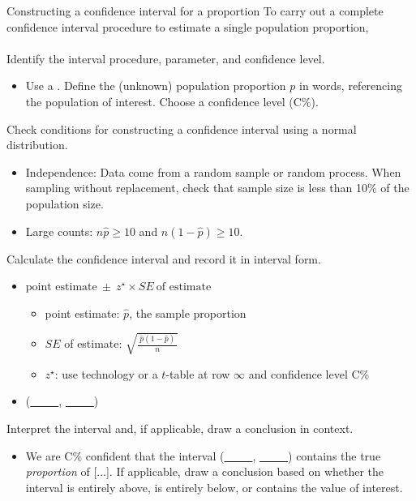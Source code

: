 \begin{onebox}{Constructing a confidence interval for a proportion}
To carry out a complete confidence interval procedure to estimate a single population proportion,
\\
\\
 Identify the interval procedure, parameter, and confidence level.\vspace{-1mm}
\begin{itemize}
\item[] Use a .  Define the (unknown) population proportion $p$ in words, referencing the population of interest.  Choose a confidence level (C\%).  
\end{itemize}
 Check conditions for constructing a confidence interval using a normal distribution.  \vspace{-1mm}
{\setlength{\leftmargini}{13mm}
\begin{itemize}
\setlength{\itemsep}{0mm}
\item[1.] Independence:  Data come from a random sample or random process.  When sampling 
without replacement, check that sample size is less than 10\% of the population size.
\item[2.] Large counts:  $n\hat{p}\ge 10$ and $n(1-\hat{p})\ge 10$.
\end{itemize}
}
 Calculate the confidence interval and record it in interval form.
\begin{itemize}
\item[] $\text{point estimate}\ \pm\ z^{\star} \times SE\ \text{of estimate}$
\begin{itemize}
\item[] point estimate: $\hat{p}$, the sample proportion
\item[] $SE$ of estimate:  $\sqrt{\frac{\ \hat{p}(1-\hat{p})\ }{n}}$
\item[] $z^{\star}$: use technology or a $t$-table at row $\infty$ and confidence level C\%
\end{itemize}
\item[] (\underline{\ \ \ \ \ }, \underline{\ \ \ \ \ })
\end{itemize}
 Interpret the interval and, if applicable, draw a conclusion in context.\vspace{-1mm}
\begin{itemize}
\item[] We are C\% confident that the interval (\underline{\ \ \ \ \ }, \underline{\ \ \ \ \ }) contains the true \emph{proportion} of [...].  If applicable, draw a conclusion based on whether the interval is entirely above, is entirely below, or contains the value of interest. 
\end{itemize}\end{onebox}



